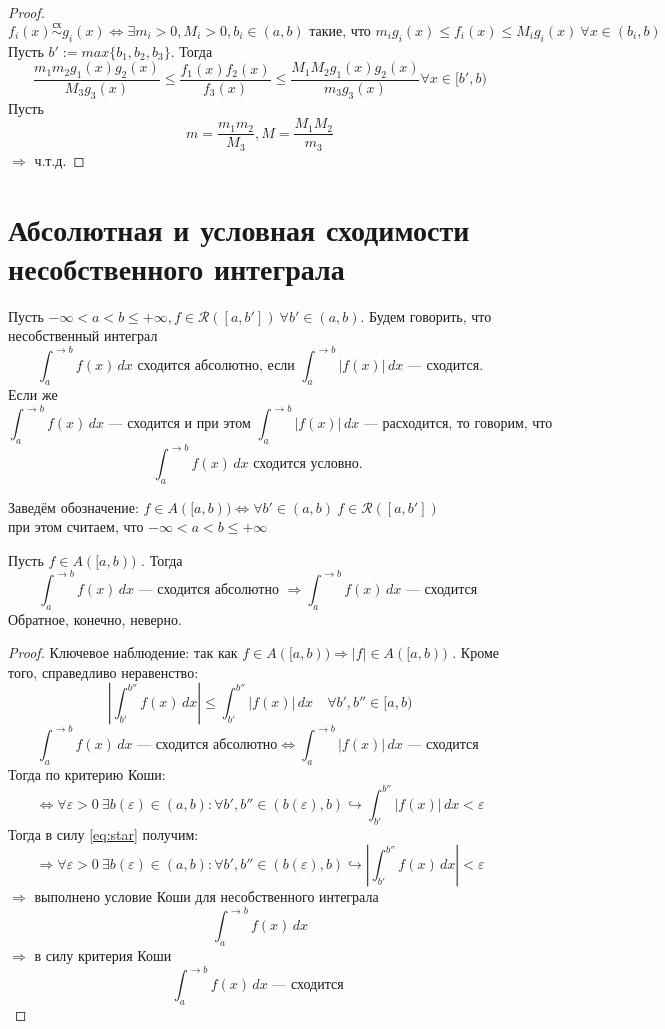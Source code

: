 \documentclass[11pt]{article}
\begin{document}
\begin{proof}
    \[ f_i(x) \overset{\text{сх}}{\sim} g_i(x) \Leftrightarrow \exists m_i>0, M_i>0, b_i\in (a,b) \text{ такие, что } m_ig_i(x)\le f_i(x)\le M_ig_i(x) \ \forall x\in (b_i,b) \]
    Пусть $b':= max \{b_1,b_2,b_3 \}$.
    Тогда
    \[ \frac{m_1m_2g_1(x)g_2(x)}{M_3g_3(x)} \le  \frac{f_1(x)f_2(x)}{f_3(x)} \le \frac{M_1M_2g_1(x)g_2(x)}{m_3g_3(x)} \forall x\in [b',b)\]
    Пусть \[ m= \frac{m_1m_2}{M_3} , M= \frac{M_1M_2}{m_3} \]
    $\Rightarrow$ ч.т.д.
\end{proof}

\section{Абсолютная и условная сходимости несобственного интеграла}

\begin{definition}
    Пусть $-\infty<a<b\le +\infty, f\in \mathcal{R}([a,b']) \ \forall b'\in(a,b) $.
    Будем говорить, что несобственный интеграл 
    \[ \int_{a}^{\to b} f(x)\,dx  \text{ сходится абсолютно, если }  \int_a^{\to b} |f(x)|\,dx \text{ --- сходится.} \]
    Если же 
    \[ \int_{a}^{\to b} f(x)\, dx \text{ --- сходится и при этом  } \int_a^{\to b} |f(x)|\,dx \text{ --- расходится, то говорим, что } \]
    \[ \int_{a}^{\to b} f(x)\,dx \text{ сходится условно. } \]
\end{definition}

\begin{remark}
    Заведём обозначение: $f\in A([a,b)) \Leftrightarrow \forall b'\in (a,b)\ f\in \mathcal{R}([a,b'])$\\
    при этом считаем, что $-\infty<a<b\le +\infty$
\end{remark}

\begin{theorem}
    Пусть $f\in A([a,b))$ . Тогда 
    \[ \int_{a}^{\to b} f(x)\,dx \text{ --- сходится абсолютно } \Rightarrow \int_{a}^{\to b} f(x)\,dx\text{ --- сходится } \]
    Обратное, конечно, неверно. 
\end{theorem}

\begin{proof}
    Ключевое наблюдение: так как $f\in A([a,b)) \Rightarrow |f|\in A([a,b))$ . Кроме того, справедливо неравенство:
    \[ \left| \int_{b'}^{b''} f(x)\,dx \right| \le \int_{b'}^{b''} |f(x)|\,dx \quad \forall b',b''\in [a,b) \tag{*}\label{eq:star} \]
    \[ \int_{a}^{\to b} f(x)\, dx \text{ --- сходится абсолютно} \Leftrightarrow \int_{a}^{\to b} |f(x)|\,dx \text{ --- сходится } \]
    Тогда по критерию Коши:
    \[ \Leftrightarrow \forall \varepsilon>0 \ \exists b(\varepsilon)\in (a,b) : \forall b',b''\in (b(\varepsilon),b) \hookrightarrow \int_{b'}^{b''} |f(x)|\,dx < \varepsilon \]
    Тогда в силу \eqref{eq:star} получим:
    \[ \Rightarrow \forall \varepsilon >0  \ \exists b(\varepsilon)\in (a,b): \forall b',b''\in (b(\varepsilon),b) \hookrightarrow \left|\int_{b'}^{b''}f(x)\,dx \right| <\varepsilon \]
    $\Rightarrow$ выполнено условие Коши для несобственного интеграла 
    \[ \int_{a}^{\to b} f(x)\,dx \]
    $\Rightarrow$ в силу критерия Коши 
    \[ \int_{a}^{\to b} f(x)\,dx \text{ --- сходится }  \]
\end{proof}
\end{document}
